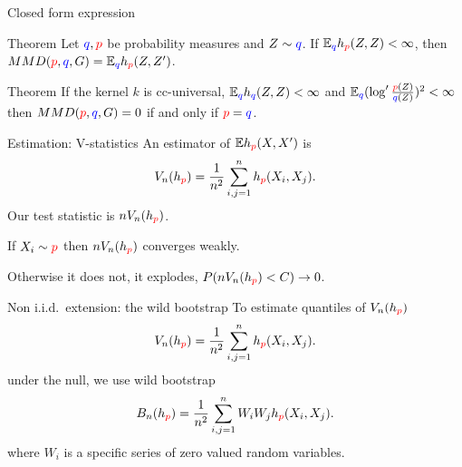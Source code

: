 \begin{frame}
\begin{columns}
\begin{column}{.33\linewidth}
\begin{block}{Closed form expression}
\end{block}

\vspace{-0.75cm}
\begin{block}{Theorem}
\large
Let ${ \color{blue} q},{\color{red} p}$ be probability measures and $Z\sim { \color{blue} q}$. 
If $\mathbb{E}_{{ \color{blue} q}} h_{{\color{red} p}}(Z,Z)<\infty$, then $MMD({\color{red} p},{ \color{blue} q},G) = \mathbb{E}_{{ \color{blue} q}} h_{{\color{red} p}}(Z,Z')$.
\end{block}
\vspace{-0.75cm}
\begin{block}{Theorem}
\large
If the kernel $k$ is cc-universal, $\mathbb{E}_{{ \color{blue} q}} h_{{ \color{blue} q}}(Z,Z)<\infty$ and $\mathbb{E}_{{ \color{blue} q}} (\log' \frac{{\color{red} p}(Z)}{{ \color{blue} q}(Z)})^{2}<\infty$
then $MMD({\color{red} p},{ \color{blue} q},G) =0$ if and only if ${\color{red} p}={ \color{blue} q}$.

\end{block}
\vspace{-0.75cm}
\begin{block}{Estimation: V-statistics}
An estimator of $\mathbb{E} h_{\color{red} p}(X,X')$ is
\begin{align*}
 V_n(h_{\color{red} p}) = \frac {1} {n^2} \sum_{i,j=1}^n h_{\color{red} p}(X_i,X_j).
\end{align*}
Our test statistic is $ n V_n(h_{\color{red} p})$.

If $X_i \sim {\color{red} p}$ then $ n V_n(h_{\color{red} p})$  converges weakly. 

Otherwise it does not,  it explodes, $P(n V_n(h_{\color{red} p}) <C) \to 0$.
\end{block}
\vspace{-0.75cm}
\begin{block}{Non i.i.d.\ extension: the wild bootstrap}
To estimate quantiles of $ V_n(h_{\color{red} p})$  
\[
 V_n(h_{\color{red} p}) = \frac {1} {n^2} \sum_{i,j=1}^n h_{\color{red} p}(X_i,X_j).
\]
under the null, we use wild bootstrap
\[
 B_n(h_{\color{red} p}) = \frac {1} {n^2} \sum_{i,j=1}^n W_i W_j h_{\color{red} p}(X_i,X_j).
\]
  where $W_i$ is a specific series of zero valued random variables.



\end{block}
\end{column}
\end{columns}
\end{frame}
